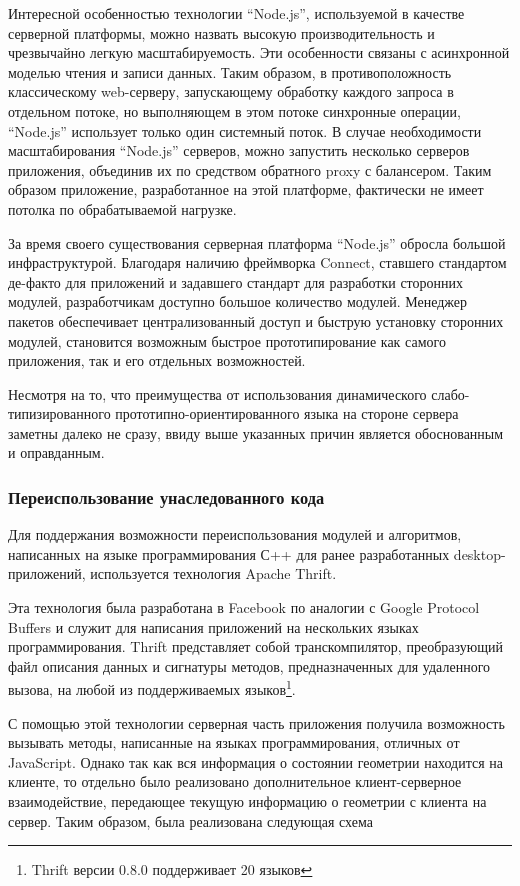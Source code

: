 \documentclass[14pt, a4paper]{extarticle}
\begin{document}
Интересной особенностью технологии ``Node.js'', используемой в качестве серверной
платформы, можно назвать высокую производительность и чрезвычайно легкую
масштабируемость. Эти особенности связаны с асинхронной моделью чтения и записи
данных. Таким образом, в противоположность классическому web-серверу,
запускающему обработку каждого запроса в отдельном потоке, но выполняющем в этом
потоке синхронные операции, ``Node.js'' использует только один системный поток.
В случае необходимости масштабирования ``Node.js'' серверов, можно запустить
несколько серверов приложения, объединив их по средством обратного proxy с
балансером. Таким образом приложение, разработанное на этой платформе,
фактически не имеет потолка по обрабатываемой нагрузке.

За время своего существования серверная платформа ``Node.js'' обросла большой
инфраструктурой. Благодаря наличию фреймворка Connect, ставшего стандартом
де-факто для приложений и задавшего стандарт для разработки сторонних модулей,
разработчикам доступно большое количество модулей. Менеджер пакетов обеспечивает
централизованный доступ и быструю установку сторонних модулей, становится
возможным быстрое прототипирование как самого приложения, так и его отдельных
возможностей.

Несмотря на то, что преимущества от использования динамического
слабо-типизированного прототипно-ориентированного языка на стороне сервера
заметны далеко не сразу, ввиду выше указанных причин является
обоснованным и оправданным.

\subsubsection{Переиспользование унаследованного кода}

Для поддержания возможности переиспользования модулей и алгоритмов, написанных
на языке программирования С++ для ранее разработанных desktop-приложений,
используется технология Apache Thrift.

Эта технология была разработана в Facebook по аналогии с Google Protocol Buffers
и служит для написания приложений на нескольких языках программирования. Thrift
представляет собой транскомпилятор, преобразующий файл описания данных и
сигнатуры методов, предназначенных для удаленного вызова, на любой из
поддерживаемых языков\footnote{Thrift версии 0.8.0 поддерживает 20 языков}.

С помощью этой технологии серверная часть приложения получила возможность
вызывать методы, написанные на языках программирования, отличных от JavaScript.
Однако так как вся информация о состоянии геометрии находится на клиенте, то
отдельно было реализовано дополнительное клиент-серверное взаимодействие,
передающее текущую информацию о геометрии с клиента на сервер. Таким образом,
была реализована следующая схема
\end{document}
